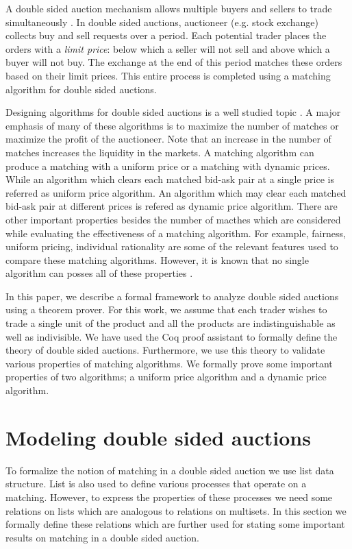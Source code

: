 \documentclass[a4paper,UKenglish,cleveref, autoref]{lipics-v2019}
\begin{document}
A double sided auction mechanism allows multiple buyers and sellers to trade simultaneously \cite{friedman}. In double sided auctions,  auctioneer (e.g. stock exchange) collects buy and sell requests over a period. Each potential trader places the orders with a \emph{limit price}: below which a seller will not sell and above which a buyer will not buy. The exchange at the end of this period matches these orders based on their limit prices. This entire process is completed using a matching algorithm for double sided auctions.  

Designing algorithms for double sided auctions is a well studied topic \cite{mcafee1992, WurmanWW98,NiuP13, ZhaoZKP10}.  A major emphasis of many of these algorithms is to maximize the number of matches or maximize the profit of the auctioneer. Note that an increase in the number of matches increases the liquidity in the markets. A matching algorithm can produce a matching with a uniform price or a matching with dynamic prices. While an algorithm which clears each matched bid-ask pair at a single price is referred as uniform price algorithm.  An algorithm which may clear each matched bid-ask pair at different prices is refered as  dynamic price algorithm. There are other important properties besides the number of macthes which are considered while evaluating the effectiveness of a matching algorithm. For example, fairness, uniform pricing, individual rationality are some of the relevant features used to compare these matching algorithms. However, it is known that no single algorithm can posses all of these properties \cite{WurmanWW98,mcafee1992}. 

In this paper, we describe a formal framework to analyze double sided auctions using a theorem prover.  For this work, we assume that each trader wishes to trade a single unit of the product and all the products are indistinguishable as well as indivisible. We have used the Coq proof assistant to formally  define the theory of double sided auctions.  Furthermore, we use this theory to validate various properties of matching algorithms. We formally prove some important properties of two algorithms; a uniform price algorithm and a dynamic price algorithm. 

\section{Modeling double sided auctions}
To formalize the notion of matching in a double sided auction we use  list data structure.  List is also used to define various processes that operate on  a matching. However, to express the properties of these processes we need some  relations on lists which are analogous to  relations on multisets. In this section we formally define these relations which are further used for stating some important results on matching in a double sided auction.
\end{document}
